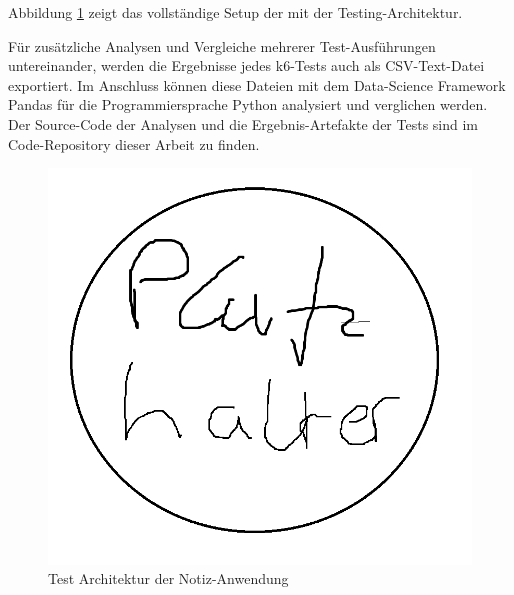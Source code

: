 Abbildung \ref{fig:test-architecture} zeigt das vollständige Setup der mit der Testing-Architektur.

Für zusätzliche Analysen und Vergleiche mehrerer Test-Ausführungen untereinander, werden die Ergebnisse jedes k6-Tests auch als CSV-Text-Datei exportiert. Im Anschluss können diese Dateien mit dem Data-Science Framework Pandas\cite{noauthor_pandas_nodate} für die Programmiersprache Python analysiert und verglichen werden. Der Source-Code der Analysen und die Ergebnis-Artefakte der Tests sind im Code-Repository dieser Arbeit zu finden.
\begin{figure}[H]
    \includegraphics[width=\textwidth]{img/platzhalter.png}
    \caption[Test Architektur der Notiz-Anwendung]{Test Architektur der Notiz-Anwendung}
    \label{fig:test-architecture}
\end{figure}

